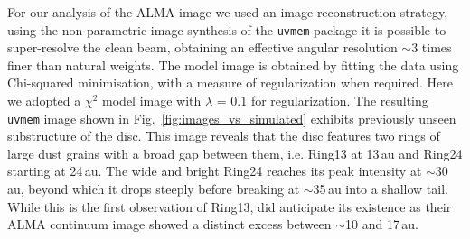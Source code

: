 \documentclass[letters,usenatbib,times]{mnras}
\begin{document}
For our analysis of the ALMA image we used an image reconstruction strategy, using the non-parametric image synthesis of the {\tt uvmem} package \citep{2006ApJ...639..951C, 2018A&C....22...16C} it is possible to super-resolve the clean beam, obtaining an effective angular resolution $\sim$3 times finer than natural weights. The model image is obtained by fitting the data using Chi-squared minimisation, with a measure of regularization when required. Here we adopted a $\chi^2$ model image with $\lambda$ = 0.1 for regularization. The resulting {\tt uvmem} image shown in Fig.~\ref{fig:images_vs_simulated} exhibits previously unseen substructure of the disc. This image reveals that the disc features two rings of large dust grains with a broad gap between them, i.e. Ring13 at 13\,au and Ring24 starting at 24\,au. The wide and bright Ring24 reaches its peak intensity at $\sim$30\,au, beyond which it drops steeply before breaking at $\sim$35\,au into a shallow tail. While this is the first observation of Ring13, \citet{Ru_z_Rodr_guez_2019} did anticipate its existence as their ALMA continuum image showed a distinct excess between
$\sim$10 and 17\,au.
\end{document}
